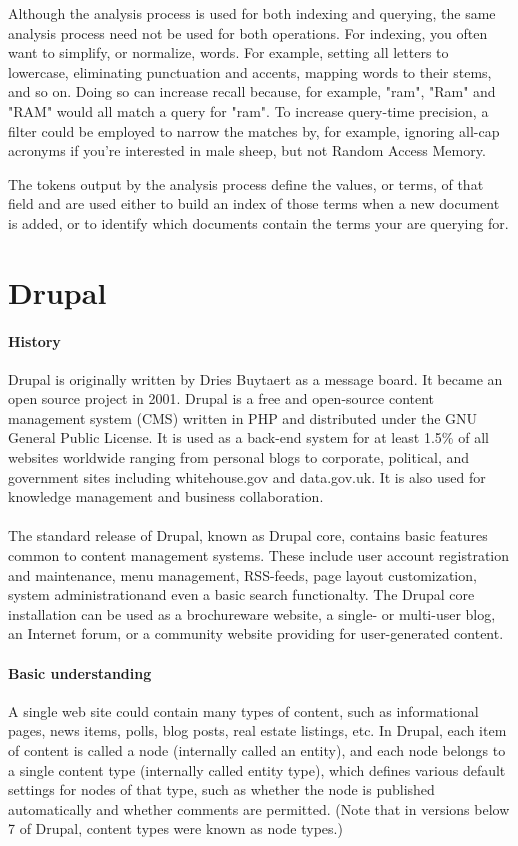 Although the analysis process is used for both indexing and querying, the same analysis process need not be used for both operations. For indexing, you often want to simplify, or normalize, words. For example, setting all letters to lowercase, eliminating punctuation and accents, mapping words to their stems, and so on. Doing so can increase recall because, for example, "ram", "Ram" and "RAM" would all match a query for "ram". To increase query-time precision, a filter could be employed to narrow the matches by, for example, ignoring all-cap acronyms if you're interested in male sheep, but not Random Access Memory.

The tokens output by the analysis process define the values, or terms, of that field and are used either to build an index of those terms when a new document is added, or to identify which documents contain the terms your are querying for.

\section{Drupal}
\paragraph{History}
Drupal is originally written by Dries Buytaert as a message board. It became an open source project in 2001. Drupal is a free and open-source content management system (CMS) written in PHP and distributed under the GNU General Public License. It is used as a back-end system for at least 1.5\% of all websites worldwide ranging from personal blogs to corporate, political, and government sites including whitehouse.gov and data.gov.uk. It is also used for knowledge management and business collaboration.

\paragraph{}
The standard release of Drupal, known as Drupal core, contains basic features common to content management systems. These include user account registration and maintenance, menu management, RSS-feeds, page layout customization, system administrationand even a basic search functionalty. The Drupal core installation can be used as a brochureware website, a single- or multi-user blog, an Internet forum, or a community website providing for user-generated content.

\paragraph{Basic understanding}
A single web site could contain many types of content, such as informational pages, news items, polls, blog posts, real estate listings, etc. In Drupal, each item of content is called a node (internally called an entity), and each node belongs to a single content type (internally called entity type), which defines various default settings for nodes of that type, such as whether the node is published automatically and whether comments are permitted. (Note that in versions below 7 of Drupal, content types were known as node types.)

